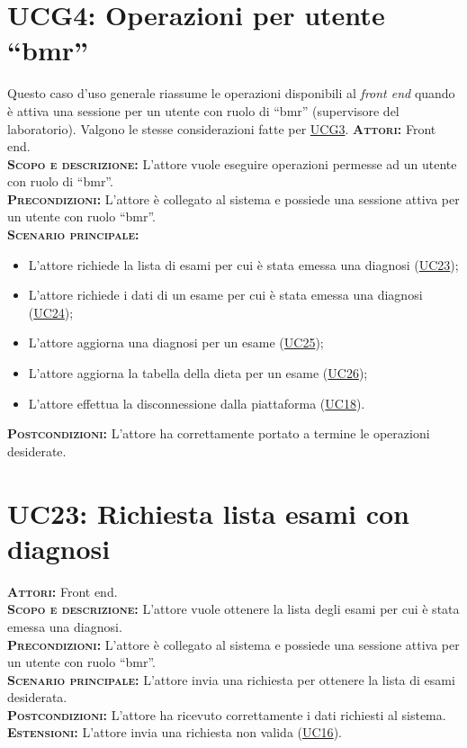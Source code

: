 \section{UCG4: Operazioni per utente ``bmr''}
\label{sec:UCG4}
Questo caso d'uso generale riassume le operazioni disponibili al \textit{front end} quando è attiva una sessione per un utente con ruolo di ``bmr'' (supervisore del laboratorio). Valgono le stesse considerazioni fatte per \hyperref[sec:UCG3]{UCG3}.
\textsc{\textbf{Attori:}} Front end.\\
\textsc{\textbf{Scopo e descrizione:}} L'attore vuole eseguire operazioni permesse ad un utente con ruolo di ``bmr''.\\
\textsc{\textbf{Precondizioni:}} L'attore è collegato al sistema e possiede una sessione attiva per un utente con ruolo ``bmr''.\\
\textsc{\textbf{Scenario principale:}} 
\begin{itemize}
    \item L'attore richiede la lista di esami per cui è stata emessa una diagnosi (\hyperref[sec:UC23]{UC23});
    \item L'attore richiede i dati di un esame per cui è stata emessa una diagnosi (\hyperref[sec:UC24]{UC24});
    \item L'attore aggiorna una diagnosi per un esame (\hyperref[sec:UC25]{UC25});
    \item L'attore aggiorna la tabella della dieta per un esame (\hyperref[sec:UC26]{UC26});
    \item L'attore effettua la disconnessione dalla piattaforma (\hyperref[sec:UC18]{UC18}).
\end{itemize}
\textsc{\textbf{Postcondizioni:}} L'attore ha correttamente portato a termine le operazioni desiderate.

\section{UC23: Richiesta lista esami con diagnosi}
\label{sec:UC23}
\textsc{\textbf{Attori:}} Front end.\\
\textsc{\textbf{Scopo e descrizione:}} L'attore vuole ottenere la lista degli esami per cui è stata emessa una diagnosi.\\
\textsc{\textsc{\textbf{Precondizioni:}}} L'attore è collegato al sistema e possiede una sessione attiva per un utente con ruolo ``bmr''.\\
\textsc{\textbf{Scenario principale:}} L'attore invia una richiesta per ottenere la lista di esami desiderata.\\
\textsc{\textbf{Postcondizioni:}} L'attore ha ricevuto correttamente i dati richiesti al sistema.\\
\textsc{\textbf{Estensioni:}} L'attore invia una richiesta non valida (\hyperref[sec:UC16]{UC16}).

